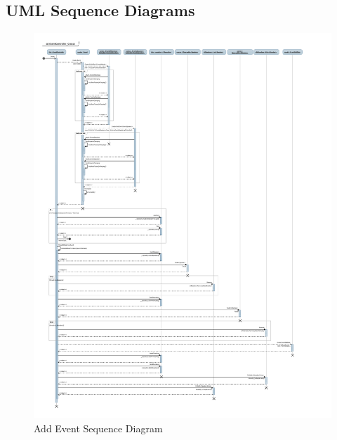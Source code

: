 \documentclass[12pt]{article}
\begin{document}
\subsection{UML Sequence Diagrams}
\begin{figure}[H]
\centering
\caption{Add Event Sequence Diagram}
\includegraphics[scale=0.7]{AddEvent_sequence}
\end{figure}
\newpage
\end{document}
